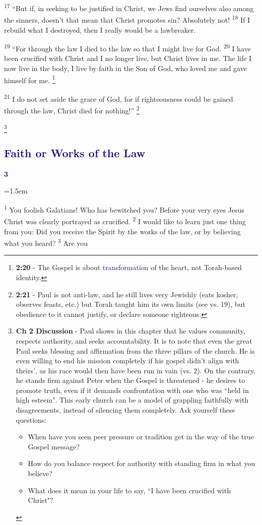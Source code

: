 \documentclass[12pt,twoside]{article}
\newcommand{\vs}[1]{\textsuperscript{#1}}
\newcommand{\vnote}[2]{%
  \begingroup
  \renewcommand\thefootnote{}%
  \footnote{\scriptsize \textbf{}#2}%
  \addtocounter{footnote}{-1}%
  \endgroup
}
\newcommand{\chapterWithIndent}[2]{%
  \noindent
  \begin{minipage}[t]{1cm}
    \vspace{-0.4\baselineskip}
    {\textcolor{MidnightBlue}{\fontsize{40pt}{48pt}\selectfont \textbf{#1}}}
  \end{minipage}%
  \hspace{0.3cm}%
  \begin{minipage}[t]{\dimexpr\linewidth - 1.5cm - 0.3cm\relax}
    \hangindent=1.5em
    \hangafter=3
    #2
    \vspace{0.05cm}
  \end{minipage}
}
\begin{document}
\vs{17} ``But if, in seeking to be justified in Christ, we Jews find ourselves also among the sinners, doesn't that mean that Christ promotes sin? Absolutely not!
\vs{18} If I rebuild what I destroyed, then I really would be a lawbreaker.

\vs{19} ``For through the law I died to the law so that I might live for God.
\vs{20} I have been crucified with Christ and I no longer live, but Christ lives in me. The life I now live in the body, I live by faith in the Son of God, who loved me and gave himself for me.\vnote{20}{\textbf{2:20} - The Gospel is about \textcolor{MidnightBlue}{transformation} of the heart, not Torah-based identity.}
\vs{21} I do not set aside the grace of God, for if righteousness could be gained through the law, Christ died for nothing!''\vnote{21}{\textbf{2:21} - Paul is not anti-law, and he still lives very Jewishly (eats kosher, observes feasts, etc.) but Torah taught him its own limits (see vs. 19), but obedience to it cannot justify, or declare someone righteous.}
\vnote{21}{\textbf{Ch 2 Discussion} - Paul shows in this chapter that he values community, respects authority, and seeks accountability. It is to note that even the great Paul seeks blessing and affirmation from the three pillars of the church. He is even willing to end his mission completely if his gospel didn't align with theirs', as his race would then have been run in vain (vs. 2). On the contrary, he stands firm against Peter when the Gospel is threatened - he desires to promote truth, even if it demands confrontation with one who was ``held in high esteem". This early church can be a model of grappling faithfully with disagreements, instead of silencing them completely. Ask yourself these questions:
\begin{itemize}
    \item When have you seen peer pressure or tradition get in the way of the true Gospel message?
    \item How do you balance respect for authority with standing firm in what you believe?
    \item What does it mean in your life to say, ``I have been crucified with Christ"?
\end{itemize}
}

\subsection*{\textcolor{MidnightBlue}{\textbf{Faith or Works of the Law}}}

\chapterWithIndent{3}{
    \vs{1} You foolish Galatians! Who has bewitched you? Before your very eyes Jesus Christ was clearly portrayed as crucified.
    \vs{2} I would like to learn just one thing from you: Did you receive the Spirit by the works of the law, or by believing what you heard?
    \vs{3} Are you
}
\end{document}
